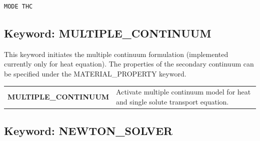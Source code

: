 \documentclass[12pt]{article}
\begin{document}
\begin{mdframed}

\begin{verbatim}
MODE THC
\end{verbatim}
\end{mdframed}

\hyperlink{target_key}{\return}


\newpage
\protect\hypertarget{target_mc}{}

\subsection{Keyword: MULTIPLE\_CONTINUUM}

This keyword initiates the multiple continuum formulation (implemented currently only for heat equation). The properties of the secondary continuum can be
specified under the MATERIAL\_PROPERTY keyword.

\begin{tabularx}{\linewidth}{lX}
\bf MULTIPLE\_CONTINUUM & Activate multiple continuum model for heat and single solute transport equation. 
\end{tabularx}

\hyperlink{target_key}{\return}


\newpage
\protect\hypertarget{target_newt}{}

\subsection{Keyword: NEWTON\_SOLVER}

\end{document}
